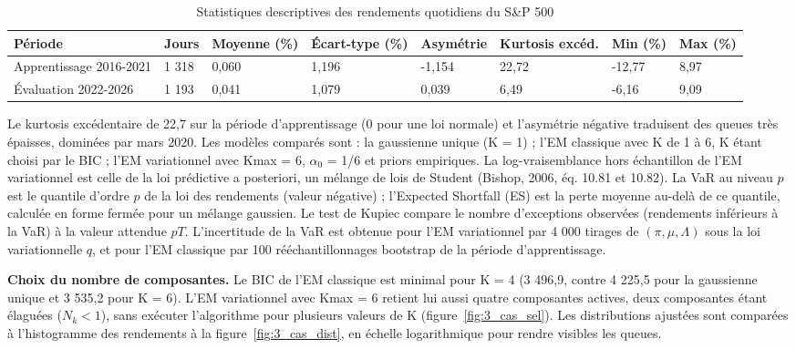 \begin{table}[H]
\centering
\small
\setlength{\tabcolsep}{0.08cm}
\footnotesize
\begin{tabular}{|p{2.8cm}|p{1.2cm}|p{1.8cm}|p{1.7cm}|p{1.8cm}|p{1.7cm}|p{1.3cm}|p{1.3cm}|}
\hline
\textbf{Période} & \textbf{Jours} & \textbf{Moyenne (\%)} & \textbf{Écart-type (\%)} & \textbf{Asymétrie} & \textbf{Kurtosis excéd.} & \textbf{Min (\%)} & \textbf{Max (\%)} \\
\hline
Apprentissage 2016-2021 & 1 318 & 0,060 & 1,196 & -1,154 & 22,72 & -12,77 & 8,97 \\
\hline
Évaluation 2022-2026 & 1 193 & 0,041 & 1,079 & 0,039 & 6,49 & -6,16 & 9,09 \\
\hline
\end{tabular}
\caption{Statistiques descriptives des rendements quotidiens du S\&P 500}
\label{tab:3_cas_desc}
\end{table}
Le kurtosis excédentaire de 22,7 sur la période d'apprentissage (0 pour une loi normale) et l'asymétrie négative traduisent des queues très épaisses, dominées par mars 2020. Les modèles comparés sont : la gaussienne unique (K = 1) ; l'EM classique avec K de 1 à 6, K étant choisi par le BIC ; l'EM variationnel avec Kmax = 6, $\alpha _{0}$ = 1/6 et priors empiriques. La log-vraisemblance hors échantillon de l'EM variationnel est celle de la loi prédictive a posteriori, un mélange de lois de Student (Bishop, 2006, éq. 10.81 et 10.82). La VaR au niveau $p$ est le quantile d'ordre $p$ de la loi des rendements (valeur négative) ; l'Expected Shortfall (ES) est la perte moyenne au-delà de ce quantile, calculée en forme fermée pour un mélange gaussien. Le test de Kupiec compare le nombre d'exceptions observées (rendements inférieurs à la VaR) à la valeur attendue $pT$. L'incertitude de la VaR est obtenue pour l'EM variationnel par 4 000 tirages de $(\pi ,\mu ,\Lambda )$ sous la loi variationnelle $q$, et pour l'EM classique par 100 rééchantillonnages bootstrap de la période d'apprentissage.

\textbf{Choix du nombre de composantes. }Le BIC de l'EM classique est minimal pour K = 4 (3 496,9, contre 4 225,5 pour la gaussienne unique et 3 535,2 pour K = 6). L'EM variationnel avec Kmax = 6 retient lui aussi quatre composantes actives, deux composantes étant élaguées ($N_{k} < 1$), sans exécuter l'algorithme pour plusieurs valeurs de K (figure~\ref{fig:3_cas_sel}). Les distributions ajustées sont comparées à l'histogramme des rendements à la figure~\ref{fig:3_cas_dist}, en échelle logarithmique pour rendre visibles les queues.

